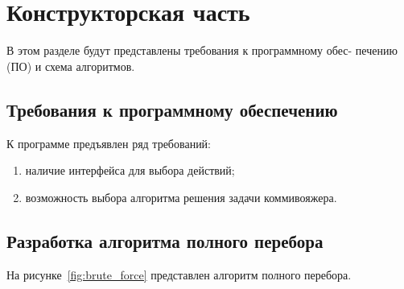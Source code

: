 \chapter{Конструкторская часть}

В этом разделе будут представлены требования к программному обес-
печению (ПО) и схема алгоритмов.

\section{Требования к программному обеспечению}

К программе предъявлен ряд требований:

\begin{enumerate}
	\item наличие интерфейса для выбора действий;
	\item возможность выбора алгоритма решения задачи коммивояжера. 
\end{enumerate}

\section{Разработка алгоритма полного перебора}

На рисунке~\ref{fig:brute_force} представлен алгоритм полного перебора.

